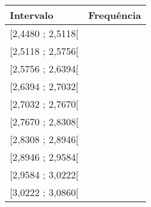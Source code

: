 \begin{savenotes}\sphinxattablestart
\centering
{}
\label{\detokenize{PE104-0:id14}}
\sphinxaftercaption
\begin{tabulary}{\linewidth}[t]{|T|T|}
\hline

Intervalo
&
Frequência
\\
\hline
{[}2,4480 ; 2,5118{[}
&\\
\hline
{[}2,5118 ; 2,5756{[}
&\\
\hline
{[}2,5756 ; 2,6394{[}
&\\
\hline
{[}2,6394 ; 2,7032{[}
&\\
\hline
{[}2,7032 ; 2,7670{[}
&\\
\hline
{[}2,7670 ; 2,8308{[}
&\\
\hline
{[}2,8308 ; 2,8946{[}
&\\
\hline
{[}2,8946 ; 2,9584{[}
&\\
\hline
{[}2,9584 ; 3,0222{[}
&\\
\hline
{[}3,0222 ; 3,0860{[}
&\\
\hline
\end{tabulary}
\par
\sphinxattableend\end{savenotes}

